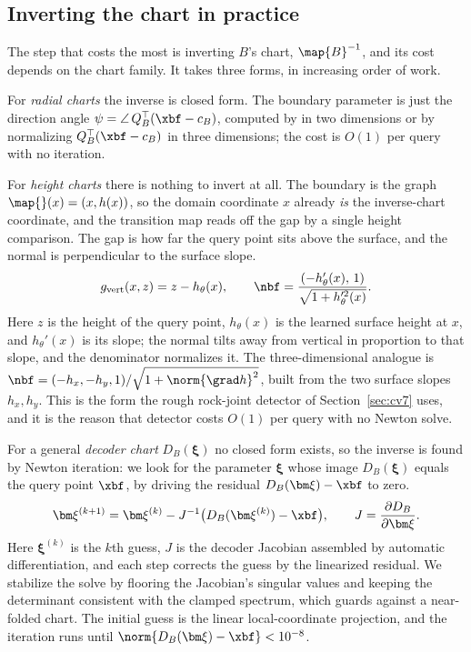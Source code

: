\subsection{Inverting the chart in practice}\label{sec:tmap:invert}

The step that costs the most is inverting $B$'s chart, $\map{B}^{-1}$, and its cost depends on the chart
family. It takes three forms, in increasing order of work.

For \emph{radial charts} the inverse is closed form. The boundary parameter is just the direction angle
$\psi=\angle\,Q_B^\top(\xbf-c_B)$, computed by  in two dimensions or by normalizing
$Q_B^\top(\xbf-c_B)$ in three dimensions; the cost is $O(1)$ per query with no iteration.

For \emph{height charts} there is nothing to invert at all. The boundary is the graph $\map{}(x)=(x,h(x))$,
so the domain coordinate $x$ already \emph{is} the inverse-chart coordinate, and the transition map reads
off the gap by a single height comparison. The gap is how far the query point sits above the surface, and
the normal is perpendicular to the surface slope.
%
\begin{equation}\label{eq:height-gap}
g_{\mathrm{vert}}(x,z)=z-h_\theta(x),\qquad
\nbf=\frac{(-h_\theta'(x),\,1)}{\sqrt{1+h_\theta'^2(x)}}.
\end{equation}
%
Here $z$ is the height of the query point, $h_\theta(x)$ is the learned surface height at $x$, and
$h_\theta'(x)$ is its slope; the normal tilts away from vertical in proportion to that slope, and the
denominator normalizes it. The three-dimensional analogue is
$\nbf=(-h_x,-h_y,1)/\sqrt{1+\norm{\grad h}^2}$, built from the two surface slopes $h_x,h_y$. This is the
form the rough rock-joint detector of Section~\ref{sec:cv7} uses, and it is the reason that detector costs
$O(1)$ per query with no Newton solve.

For a general \emph{decoder chart} $D_B(\bm\xi)$ no closed form exists, so the inverse is found by Newton
iteration: we look for the parameter $\bm\xi$ whose image $D_B(\bm\xi)$ equals the query point $\xbf$, by
driving the residual $D_B(\bm\xi)-\xbf$ to zero.
%
\begin{equation}\label{eq:newton-invert}
\bm\xi^{(k+1)}=\bm\xi^{(k)}-J^{-1}\big(D_B(\bm\xi^{(k)})-\xbf\big),\qquad
J=\frac{\partial D_B}{\partial\bm\xi}.
\end{equation}
%
Here $\bm\xi^{(k)}$ is the $k$th guess, $J$ is the decoder Jacobian assembled by automatic
differentiation, and each step corrects the guess by the linearized residual. We stabilize the solve by
flooring the Jacobian's singular values and keeping the determinant consistent with the clamped spectrum,
which guards against a near-folded chart. The initial guess is the linear local-coordinate projection, and
the iteration runs until $\norm{D_B(\bm\xi)-\xbf}<10^{-8}$.

